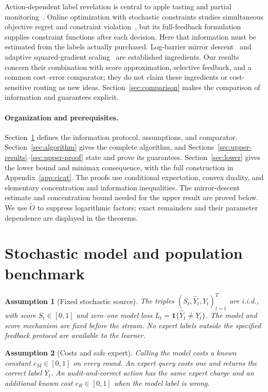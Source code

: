 \documentclass[11pt]{article}
\newtheorem{assumption}{Assumption}
\theoremstyle{remark}
\newcommand{\ind}{\mathbf 1}
\begin{document}
Action-dependent label revelation is central to apple tasting and partial
monitoring~\cite{partial}. Online optimization with stochastic constraints
studies simultaneous objective regret and constraint
violation~\cite{stochastic}, but its full-feedback formulation supplies
constraint functions after each decision. Here that information must be
estimated from the labels actually purchased. Log-barrier mirror
descent~\cite{barrier} and adaptive squared-gradient scaling~\cite{adagrad}
are established ingredients. Our results concern their combination with
score approximation, selective feedback, and a common cost--error
comparator; they do not claim these ingredients or cost-sensitive routing
as new ideas. Section~\ref{sec:comparison} makes the comparison of
information and guarantees explicit.

\paragraph{Organization and prerequisites.}
Section~\ref{sec:model} defines the information protocol, assumptions,
and comparator. Section~\ref{sec:algorithm} gives the complete algorithm,
and Sections~\ref{sec:upper-results}--\ref{sec:upper-proof} state and prove
its guarantees. Section~\ref{sec:lower} gives the lower bound and minimax
consequence, with the full construction in Appendix~\ref{app:cicat}.
The proofs use conditional expectation, convex duality, and elementary
concentration and information inequalities. The mirror-descent estimate
and concentration bound needed for the upper result are proved below.
We use $\widetilde O$ to suppress logarithmic factors; exact remainders
and their parameter dependence are displayed in the theorems.

\section{Stochastic model and population benchmark}
\label{sec:model}

\begin{assumption}[Fixed stochastic source]
\label{ass:iid}
The triples $(S_t,\widehat Y_t,Y_t)_{t=1}^T$ are i.i.d., with score
$S_t\in[0,1]$ and zero--one model loss
$L_t=\ind\{\widehat Y_t\ne Y_t\}$. The model and score mechanism are
fixed before the stream. No expert labels outside the specified feedback
protocol are available to the learner.
\end{assumption}

\begin{assumption}[Costs and safe expert]
\label{ass:cost}
Calling the model costs a known constant $c_M\in[0,1]$ on every round.
An expert query costs one and returns the correct label $Y_t$.
An audit-and-correct action has the same expert charge and an additional
known cost $c_R\in[0,1]$ when the model label is wrong.
\end{assumption}
\end{document}
